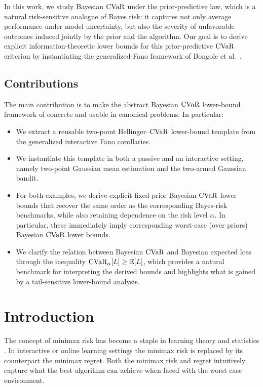 \documentclass[conference]{IEEEtran}
\begin{document}
In this work, we study Bayesian \(\textup{CVaR}\) under the prior-predictive law, which is a natural risk-sensitive analogue of Bayes risk: it captures not only average performance under model uncertainty, but also the severity of unfavorable outcomes induced jointly by the prior and the algorithm. Our goal is to derive explicit information-theoretic lower bounds for this prior-predictive \(\textup{CVaR}\) criterion by instantiating the generalized-Fano framework of Bongole et al.~\cite{bongole2026generalizing}.



\subsection{Contributions}

The main contribution is to make the abstract Bayesian \(\textup{CVaR}\) lower-bound framework of \cite{bongole2026generalizing} concrete and usable in canonical problems. In particular:
\begin{itemize}
    \item We extract a reusable two-point Hellinger--\(\textup{CVaR}\) lower-bound template from the generalized interactive Fano corollaries. 

    \item We instantiate this template in both a passive and an interactive setting, namely two-point Gaussian mean estimation and the two-armed Gaussian bandit.

     \item For both examples, we derive explicit fixed-prior Bayesian \(\textup{CVaR}\) lower bounds that recover the same order as the corresponding Bayes-risk benchmarks, while also retaining dependence on the risk level \(\alpha\). In particular, these immediately imply corresponding worst-case (over priors) Bayesian \(\textup{CVaR}\) lower bounds.

    \item We clarify the relation between Bayesian \(\textup{CVaR}\) and Bayesian expected loss through the inequality \(\textup{CVaR}_\alpha[L]\ge \mathbb{E}[L]\), which provides a natural benchmark for interpreting the derived bounds and highlights what is gained by a tail-sensitive lower-bound analysis.


\end{itemize}







\iffalse
\section{Introduction}
The concept of minimax risk has become a staple in learning theory and statistics \cite{ma2024high}\cite{audibert2009minimax} \cite{azar2017minimax}.  In interactive or online learning settings the minimax risk is replaced by its counterpart the minimax regret. Both the minimax risk and regret intuitively capture what the best algorithm can achieve when faced with the worst case environment.
\end{document}
